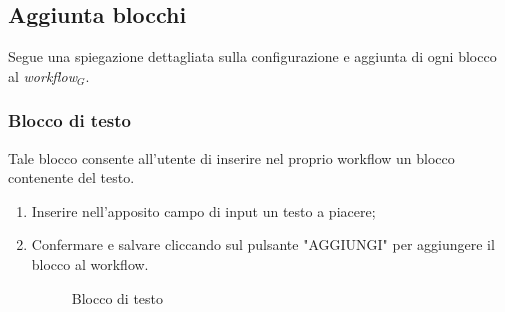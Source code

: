 \newpage
\subsection{Aggiunta blocchi}
Segue una spiegazione dettagliata sulla configurazione e aggiunta di ogni blocco al \textit{workflow$_{G}$}.\\

\subsubsection{Blocco di testo}
Tale blocco consente all'utente di inserire nel proprio workflow un blocco contenente del testo.
\begin{enumerate}
	\item Inserire nell'apposito campo di input un testo a piacere;
	\item Confermare e salvare cliccando sul pulsante "AGGIUNGI" per aggiungere il blocco al workflow.
	\begin{figure}[!ht]
		\centering
		\caption{Blocco di testo}
	\end{figure}
\end{enumerate}
\newpage
